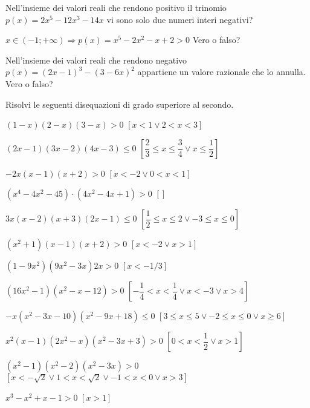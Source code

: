 \begin{esercizio}
\label{ese:4.35}
Nell'insieme dei valori reali che rendono positivo il trinomio 
\(p(x)=2x^5-12x^3-14x\) vi sono solo due numeri interi negativi?
\end{esercizio}

\begin{esercizio}
 \label{ese:4.36}
\(x\in (-1;+\infty )\Rightarrow p(x)=x^5-2x^2-x+2>0\) Vero o falso?
\end{esercizio}

\begin{esercizio}
\label{ese:4.37}
Nell'insieme dei valori reali che rendono negativo \(p(x)=(2x-1)^3-(3-6x)^2\) 
appartiene un valore razionale che lo annulla. Vero o falso?
\end{esercizio}

\begin{esercizio}[*]
\label{ese:4.38}
Risolvi le seguenti disequazioni di grado superiore al secondo.
\begin{enumeratea}
\item \((1-x)(2-x)(3-x)>0\) \hfill \(\left[x<1\vee 2<x<3\right]\)
\item \((2x-1)(3x-2)(4x-3)\le 0\) 
 \hfill \(\left[\dfrac 2 3\le x\le \dfrac 3 4 \vee x\le \dfrac 1 2\right]\)
\item \(-2x(x-1)(x+2)>0\) \hfill \(\left[x<-2\vee 0<x<1\right]\)
\item \( \left(x^4-4x^2-45\right)\cdot \left(4x^2-4x+1\right)>0 \) 
 \hfill \(\left[\right]\)
\item \(3x(x-2)(x+3)(2x-1)\le 0\) 
 \hfill \(\left[\dfrac 1 2\le x\le 2\vee -3\le x\le 0\right]\)
\item \(\left(x^2+1\right)(x-1)(x+2)>0\) \hfill \(\left[x<-2\vee x>1\right]\)
\item \(\left(1-9x^2\right)\left(9x^2-3x\right)2x>0\) 
 \hfill \(\left[x<-1/3\right]\)
\item \(\left(16x^2-1\right)\left(x^2-x-12\right)>0\) 
 \hfill \(\left[-\dfrac 1 4<x<\dfrac 1 4\vee x<-3\vee x>4\right]\)
\item \(-x\left(x^2-3x-10\right)\left(x^2-9x+18\right)\le 0\)
 \hfill \(\left[3\le x\le 5\vee -2\le x\le 0\vee x\ge 6\right]\)
\item \(x^2(x-1)\left(2x^2-x\right)\left(x^2-3x+3\right)>0\)
 \hfill \(\left[0<x<\dfrac 1 2\vee x>1\right]\)
\item \(\left(x^2-1\right)\left(x^2-2\right)\left(x^2-3x\right)>0\)
 \hfill \(\left[x<-\sqrt 2\vee 1<x<\sqrt 2\vee -1<x<0\vee x>3\right]\)
\item \(x^3-x^2+x-1>0\) \hfill \(\left[x>1\right]\)

\end{enumeratea}
\end{esercizio}
